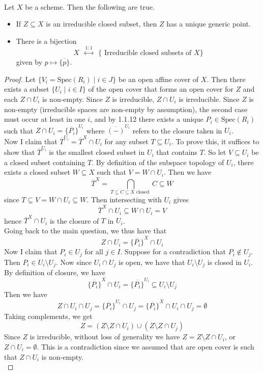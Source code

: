 \documentclass[a4paper]{article}
\begin{document}
\begin{lmm}{}{}\\
Let $X$ be a scheme. Then the following are true. 
\begin{itemize}
\item If $Z\subseteq X$ is an irreducible closed subset, then $Z$ has a unique generic point. 
\item There is a bijection $$X\;\;\overset{1:1}{\longleftrightarrow}\;\;\{\text{ Irreducible closed subsets of }X\}$$ given by $p\mapsto\overline{\{p\}}$. 
\end{itemize}
\begin{proof}
Let $\{V_i=\text{Spec}(R_i)\;|\;i\in J\}$ be an open affine cover of $X$. Then there exists a subset $\{U_i\;|\;i\in I\}$ of the open cover that forms an open cover for $Z$ and each $Z\cap U_i$ is non-empty. Since $Z$ is irreducible, $Z\cap U_i$ is irreducible. Since $Z$ is non-empty (irreducible spaces are non-empty by assumption), the second case must occur at least in one $i$, and by 1.1.12 there exists a unique $P_i\in\text{Spec}(R_i)$ such that $Z\cap U_i=\overline{\{P_i\}}^{U_i}$ where $\overline{(-)}^{U_i}$ refers to the closure taken in $U_i$. \\

Now I claim that $\overline{T}^{U_i}=\overline{T}^X\cap U_i$ for any subset $T\subseteq U_i$. To prove this, it suffices to show that $\overline{T}^{U_i}$ is the smallest closed subset in $U_i$ that contains $T$. So let $V\subseteq U_i$ be a closed subset containing $T$. By definition of the subspace topology of $U_i$, there exists a closed subset $W\subseteq X$ such that $V=W\cap U_i$. Then we have $$\overline{T}^X=\bigcap_{T\subseteq C\subseteq X\text{ closed }}C\subseteq W$$ since $T\subseteq V=W\cap U_i\subseteq W$. Then intersecting with $U_i$ gives $$\overline{T}^{X}\cap U_i\subseteq W\cap U_i=V$$ hence $\overline{T}^X\cap U_i$ is the closure of $T$ in $U_i$. \\

Going back to the main question, we thus have that $$Z\cap U_i=\overline{\{P_i\}}^X\cap U_i$$ Now I claim that $P_i\in U_j$ for all $j\in I$. Suppose for a contradiction that $P_i\notin U_j$. Then $P_i\in U_i\setminus U_j$. Now since $U_i\cap U_j$ is open, we have that $U_i\setminus U_j$ is closed in $U_i$. By definition of closure, we have $$\overline{\{P_i\}}^X\cap U_i=\overline{\{P_i\}}^{U_i}\subseteq U_i\setminus U_j$$ Then we have $$Z\cap U_i\cap U_j=\overline{\{P_i\}}^{U_i}\cap U_j=\overline{\{P_i\}}^X\cap U_i\cap U_j=\emptyset$$ Taking complements, we get $$Z=(Z\setminus Z\cap U_i)\cup(Z\setminus Z\cap U_j)$$ Since $Z$ is irreducible, without loss of generality we have $Z=Z\setminus Z\cap U_i$, or $Z\cap U_i=\emptyset$. This is a contradiction since we assumed that are open cover is such that $Z\cap U_i$ is non-empty. \\


\end{proof}
\end{lmm}
\end{document}
